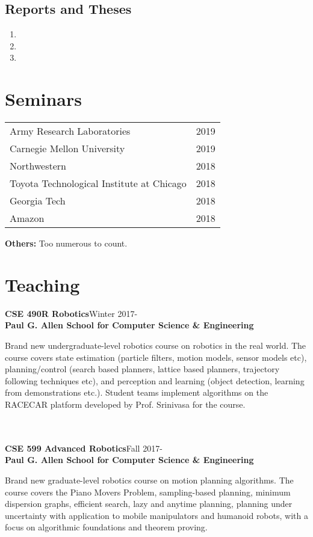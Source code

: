 \documentclass[10pt]{article}
\begin{document}
\subsection{Reports and Theses}
\begin{enumerate}
\item {}
\item {}
\item {}
\end{enumerate}


\section{Seminars}
\begin{center}
\begin{tabularx}{\linewidth}{Xr}
Army Research Laboratories & 2019\\
Carnegie Mellon University & 2019\\
Northwestern & 2018\\
Toyota Technological Institute at Chicago & 2018\\
Georgia Tech & 2018\\
Amazon & 2018\\
\end{tabularx}
\end{center}
\noindent \textbf{Others:} Too numerous to count.

\section{Teaching}
\noindent
\textbf{CSE 490R Robotics}\hfill Winter 2017-\\
\textbf{Paul G. Allen School for Computer Science \& Engineering}\\
\parbox[t]{0.75\textwidth}{
Brand new undergraduate-level robotics course on robotics in the real world. The course covers state estimation (particle filters, motion models, sensor models etc), planning/control (search based planners, lattice based planners, trajectory following techniques etc), and perception and learning (object detection, learning from demonstrations etc.). Student teams implement algorithms on the RACECAR platform developed by Prof. Srinivasa for the course.
}\\
\\
\noindent
\textbf{CSE 599 Advanced Robotics}\hfill Fall 2017-\\
\textbf{Paul G. Allen School for Computer Science \& Engineering}\\
\parbox[t]{0.75\textwidth}{
Brand new graduate-level robotics course on motion planning algorithms. The course covers the Piano Movers Problem, sampling-based planning, minimum dispersion graphs, efficient search, lazy and anytime planning, planning under uncertainty with application to mobile manipulators and humanoid robots, with a focus on algorithmic foundations and theorem proving.
}
\end{document}
